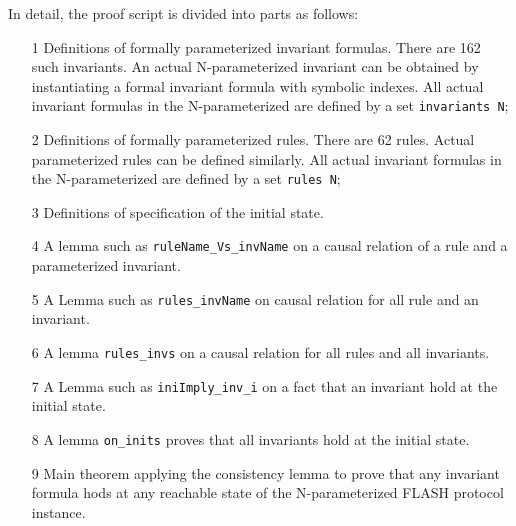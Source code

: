 \documentclass{llncs}
\begin{document}
In detail, the proof script is divided into   parts as follows:
\begin{enumerate}
\item[1] Definitions of formally parameterized invariant formulas.%
    There are 162 such invariants. An actual N-parameterized invariant can be obtained by instantiating a formal invariant formula with symbolic indexes. All   actual invariant formulas in the N-parameterized are defined by a set {\tt invariants N};

\item[2] Definitions of formally parameterized rules. There are 62 rules. %
    Actual parameterized rules can be defined similarly. All actual invariant formulas in the N-parameterized are defined by a set {\tt rules N};

\item[3]  Definitions of specification of the initial state. %

\item[4] A lemma  such as {\tt ruleName\_Vs\_invName} on a causal relation of a rule and a parameterized invariant. %


\item[5]  A  Lemma  such as {\tt rules\_invName} on causal relation for  all rule and an invariant.%


\item[6] A lemma {\tt rules\_invs} on a causal relation for all rules and all invariants. %

\item[7] A Lemma such as {\tt iniImply\_inv\_i} on a fact that an invariant  hold at the initial state. %

\item[8] A lemma {\tt on\_inits} proves that  all invariants hold at the initial state. %

\item[9] Main theorem  applying the consistency lemma to prove that any invariant formula  hods at any reachable state of the  N-parameterized FLASH protocol instance.
\end{enumerate}
\end{document}
